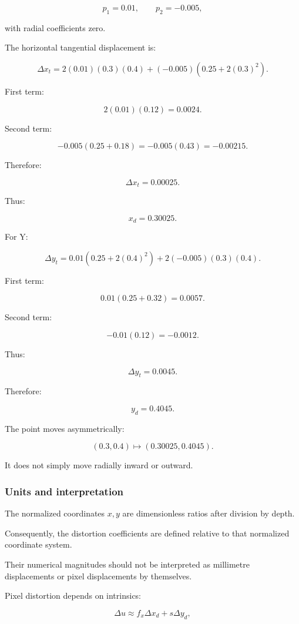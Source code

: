\[
 p_1=0.01,\qquad p_2=-0.005,
\]

with radial coefficients zero.

The horizontal tangential displacement is:

\[
 \Delta x_t= 2(0.01)(0.3)(0.4) +(-0.005)(0.25+2(0.3)^2).
\]

First term:

\[
 2(0.01)(0.12)=0.0024.
\]

Second term:

\[
 -0.005(0.25+0.18) =-0.005(0.43) =-0.00215.
\]

Therefore:

\[
 \boxed{ \Delta x_t=0.00025 }.
\]

Thus:

\[
 \boxed{x_d=0.30025}.
\]

For Y:

\[
 \Delta y_t= 0.01(0.25+2(0.4)^2) +2(-0.005)(0.3)(0.4).
\]

First term:

\[
 0.01(0.25+0.32)=0.0057.
\]

Second term:

\[
 -0.01(0.12)=-0.0012.
\]

Thus:

\[
 \boxed{ \Delta y_t=0.0045 }.
\]

Therefore:

\[
 \boxed{y_d=0.4045}.
\]

The point moves asymmetrically:

\[
 (0.3,0.4)\mapsto(0.30025,0.4045).
\]

It does not simply move radially inward or outward.

\subsubsection{Units and interpretation}\label{units-and-interpretation}

The normalized coordinates \(x,y\) are dimensionless ratios after division by depth.

Consequently, the distortion coefficients are defined relative to that normalized coordinate system.

Their numerical magnitudes should not be interpreted as millimetre displacements or pixel displacements by themselves.

Pixel distortion depends on intrinsics:

\[
 \Delta u\approx f_x\Delta x_d+s\Delta y_d,
\]

